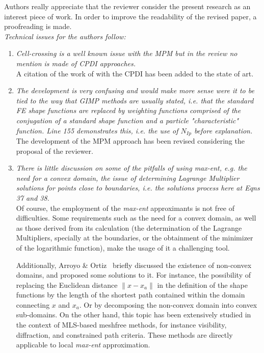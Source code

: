 \documentclass[12pt]{article}
\begin{document}
Authors really appreciate that the reviewer consider the present research as an interest piece of work. In order to improve the readability of the revised paper, a proofreading is made.\\

\textit{Technical issues for the authors follow:}
 \begin{enumerate}
\item \textit{Cell-crossing is a well known issue with the MPM but in the review no mention is made of CPDI approaches.}\\

A citation of the work of \cite{Sadeghirad_2011} with the CPDI has been added to the state of art.

\item \textit{The development is very confusing and would make more sense were it to be tied to 
the way that GIMP methods are usually stated, i.e. that the standard FE shape functions are replaced by weighting functions comprised of the conjugation of a standard shape function and a particle "characteristic" function. Line 155 demonstrates this, i.e. the use of $N_{Ip}$ before explanation.}\\

The development of the MPM approach has been revised considering the proposal of the reviewer. 

\item \textit{There is little discussion on some of the pitfalls of using max-ent, e.g. the need for a convex domain, the issue of determining Lagrange Multiplier solutions for points close to boundaries, i.e. the solutions process here at Eqns 37 and 38.}\\

Of course, the employment of the \textit{max-ent} approximants is not free of difficulties. Some requirements such as the need for a convex domain, as well as those derived from its calculation (the determination of the Lagrange Multipliers, specially at the boundaries, or the obtainment of the minimizer of the logarithmic function), make the usage of it a challenging tool.

Additionally, Arroyo \& Ortiz~\cite{Arroyo2006} briefly discussed the existence of non-convex domains, and proposed some solutions to it.  For instance, the possibility of replacing the Euclidean distance $\lVert  x - x_a  \rVert$ in the definition of the shape functions by the length of the shortest path contained within the domain connecting $x$ and $x_a$. Or by decomposing the non-convex domain into convex sub-domains.  On the other hand, this topic has been extensively studied in the context of MLS-based meshfree methods, for instance visibility, diffraction, and constrained path criteria.  These methods are directly applicable to local \textit{max-ent} approximation. 


\end{enumerate}
\end{document}
